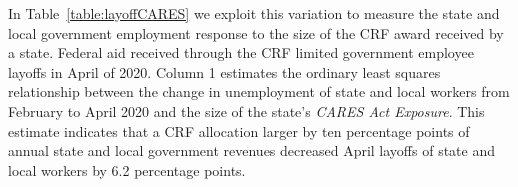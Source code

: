 
In Table~\ref{table:layoffCARES} we exploit this variation to measure the state and local government employment response to the size of the CRF award received by a state. Federal aid received through the CRF limited government employee layoffs in April of 2020. Column 1 estimates the ordinary least squares relationship between the change in unemployment of state and local workers from February to April 2020 and the size of the state's \emph{CARES Act Exposure}. This estimate indicates that a CRF allocation larger by ten percentage points of annual state and local government revenues decreased April layoffs of state and local workers by 6.2 percentage points.

